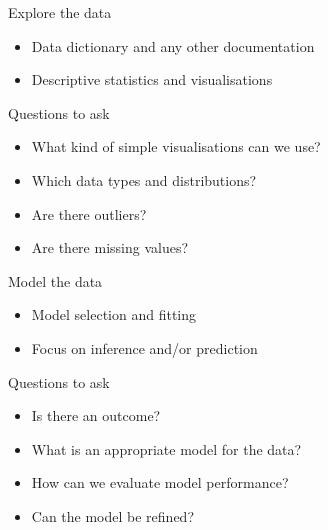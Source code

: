 \begin{frame}[t]{Explore the data}
    \begin{itemize}
        \item Data dictionary and any other documentation
        \item \alert{Descriptive statistics} and \alert{visualisations}
    \end{itemize}
    \vfill
    \begin{block}{Questions to ask}
        \begin{itemize}
            \item What kind of simple visualisations can we use?
            \item Which data types and distributions?
            \item Are there outliers?
            \item Are there missing values?
        \end{itemize}
    \end{block}
\end{frame}

\begin{frame}[t]{Model the data}\vspace{-1ex}
    \begin{itemize}
        \item \alert{Model selection} and fitting
        \item Focus on inference and/or prediction
    \end{itemize}
    \vfill
    \begin{block}{Questions to ask}
        \begin{itemize}
            \item Is there an outcome?
            \item What is an appropriate model for the data?
            \item How can we evaluate model performance?
            \item Can the model be refined?
        \end{itemize}
    \end{block}
\end{frame}

